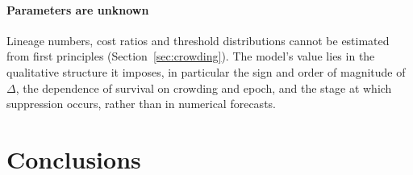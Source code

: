 \documentclass[preprint,12pt]{elsarticle}
\theoremstyle{definition}
\begin{document}
\paragraph{Parameters are unknown}
Lineage numbers, cost ratios and threshold distributions cannot be estimated from first principles (Section~\ref{sec:crowding}). The model's value lies in the qualitative structure it imposes, in particular the sign and order of magnitude of $\Delta$, the dependence of survival on crowding and epoch, and the stage at which suppression occurs, rather than in numerical forecasts.

\section{Conclusions}
\label{sec:conclusions}
\end{document}
